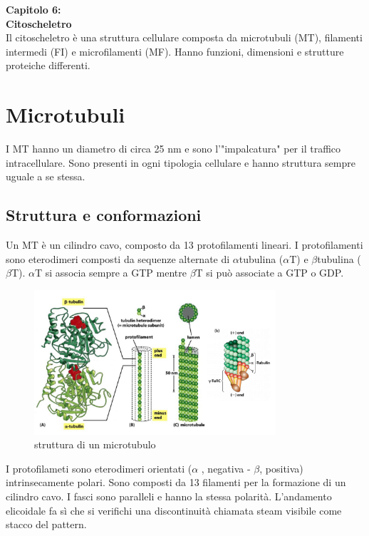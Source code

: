 \Large\textbf{Capitolo 6: \\Citoscheletro}\\

\small
Il citoscheletro è una struttura cellulare composta da microtubuli (MT), filamenti intermedi (FI) e microfilamenti (MF). Hanno funzioni, dimensioni e strutture proteiche differenti.

\section{Microtubuli}
    I MT hanno un diametro di circa 25 nm e sono l'"impalcatura" per il traffico intracellulare. Sono presenti in ogni tipologia cellulare e hanno struttura sempre uguale a se stessa.
    \subsection{Struttura e conformazioni}
        Un MT è un cilindro cavo, composto da 13 protofilamenti lineari. I protofilamenti sono eterodimeri composti da sequenze alternate di $\alpha$tubulina ($\alpha$T) e $\beta$tubulina ($\beta$T). $\alpha$T si associa sempre a GTP mentre $\beta$T si può associate a GTP o GDP. \\
        \begin{figure}[h]
            \centering
            \includegraphics[width=0.8\textwidth]{images/MT.JPG}
            \caption{\small struttura di un microtubulo}
            \label{fig:mesh1}
        \end{figure}
        I protofilameti sono eterodimeri orientati ($\alpha$ , negativa - $\beta$, positiva) intrinsecamente polari. Sono composti da 13 filamenti per la formazione di un cilindro cavo. I fasci sono paralleli e hanno la stessa polarità. L'andamento elicoidale fa sì che si verifichi una discontinuità chiamata steam visibile come stacco del pattern.    \\
